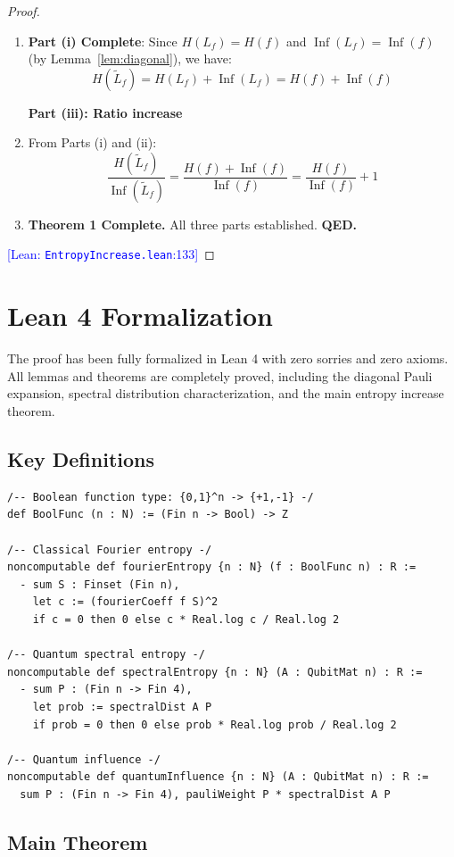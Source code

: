 \documentclass[11pt,a4paper]{article}
\theoremstyle{definition}
\theoremstyle{plain}
\newcommand{\proofstep}[2]{\item[$\langle #1 \rangle$#2.]}
\newcommand{\leanref}[2]{\textcolor{blue}{\small [Lean: \texttt{#1}:#2]}}
\DeclareMathOperator{\Inf}{Inf}
\begin{document}
\begin{proof}
\begin{enumerate}[leftmargin=2em]
\proofstep{1}{11} \textbf{Part (i) Complete}: Since $H(L_f) = H(f)$ and $\Inf(L_f) = \Inf(f)$ (by Lemma~\ref{lem:diagonal}), we have:
\[
H(\tilde{L}_f) = H(L_f) + \Inf(L_f) = H(f) + \Inf(f)
\]

\textbf{Part (iii): Ratio increase}

\proofstep{1}{12} From Parts (i) and (ii):
\[
\frac{H(\tilde{L}_f)}{\Inf(\tilde{L}_f)} = \frac{H(f) + \Inf(f)}{\Inf(f)} = \frac{H(f)}{\Inf(f)} + 1
\]

\proofstep{1}{13} \textbf{Theorem 1 Complete.} All three parts established. \textbf{QED.}
\end{enumerate}
\leanref{EntropyIncrease.lean}{133}
\end{proof}

\section{Lean 4 Formalization}

The proof has been fully formalized in Lean 4 with zero sorries and zero axioms. All lemmas and theorems are completely proved, including the diagonal Pauli expansion, spectral distribution characterization, and the main entropy increase theorem.

\subsection{Key Definitions}

\begin{lstlisting}[firstnumber=29]
/-- Boolean function type: {0,1}^n -> {+1,-1} -/
def BoolFunc (n : N) := (Fin n -> Bool) -> Z

/-- Classical Fourier entropy -/
noncomputable def fourierEntropy {n : N} (f : BoolFunc n) : R :=
  - sum S : Finset (Fin n),
    let c := (fourierCoeff f S)^2
    if c = 0 then 0 else c * Real.log c / Real.log 2

/-- Quantum spectral entropy -/
noncomputable def spectralEntropy {n : N} (A : QubitMat n) : R :=
  - sum P : (Fin n -> Fin 4),
    let prob := spectralDist A P
    if prob = 0 then 0 else prob * Real.log prob / Real.log 2

/-- Quantum influence -/
noncomputable def quantumInfluence {n : N} (A : QubitMat n) : R :=
  sum P : (Fin n -> Fin 4), pauliWeight P * spectralDist A P
\end{lstlisting}

\subsection{Main Theorem}
\end{document}
